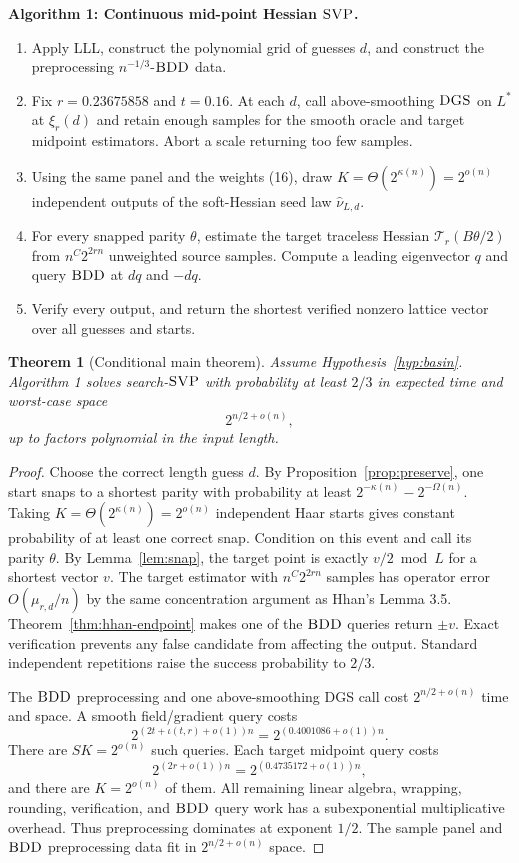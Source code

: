 \documentclass[10pt]{article}
\newtheorem{theorem}{Theorem}[section]
\theoremstyle{definition}
\newcommand{\SVP}{\textnormal{\textsc{SVP}}}
\newcommand{\BDD}{\textnormal{\textsc{BDD}}}
\newcommand{\DGS}{\textnormal{\textsc{DGS}}}
\newcommand{\what}{\widehat}
\newcommand{\cT}{\mathcal{T}}
\begin{document}
\medskip
\noindent\textbf{Algorithm 1: Continuous mid-point Hessian $\SVP$.}
\begin{enumerate}[leftmargin=2.2em,label=\arabic*.]
\item Apply LLL, construct the polynomial grid of guesses $d$, and construct
the preprocessing $n^{-1/3}$-$\BDD$ data.
\item Fix $r=0.23675858$ and $t=0.16$.  At each $d$, call above-smoothing
$\DGS$ on $L^*$ at $\xi_r(d)$ and retain enough samples for the smooth oracle
and target midpoint estimators.  Abort a scale returning too few samples.
\item Using the same panel and the weights (16), draw
$K=\Theta(2^{\kappa(n)})=2^{o(n)}$ independent outputs of the soft-Hessian
seed law $\what\nu_{L,d}$.
\item For every snapped parity $\theta$, estimate the target traceless
Hessian $\cT_r(B\theta/2)$ from $n^{C}2^{2rn}$ unweighted source samples.
Compute a leading eigenvector $q$ and query $\BDD$ at $dq$ and $-dq$.
\item Verify every output, and return the shortest verified nonzero lattice
vector over all guesses and starts.
\end{enumerate}

\begin{theorem}[Conditional main theorem]                          \label{thm:main}
Assume Hypothesis~\ref{hyp:basin}.  Algorithm 1 solves search-$\SVP$ with
probability at least $2/3$ in expected time and worst-case space
\[
 2^{n/2+o(n)},
\]
up to factors polynomial in the input length.
\end{theorem}

\begin{proof}
Choose the correct length guess $d$.  By
Proposition~\ref{prop:preserve}, one start snaps to a shortest parity with
probability at least $2^{-\kappa(n)}-2^{-\Omega(n)}$.  Taking
$K=\Theta(2^{\kappa(n)})=2^{o(n)}$ independent Haar starts gives constant
probability of at least one correct snap.  Condition on this event and call
its parity $\theta$.  By
Lemma~\ref{lem:snap}, the target point is exactly $v/2\bmod L$ for a shortest
vector $v$.  The target estimator with $n^C2^{2rn}$ samples has operator
error $O(\mu_{r,d}/n)$ by the same concentration argument as Hhan's Lemma
3.5.  Theorem~\ref{thm:hhan-endpoint} makes one of the $\BDD$ queries return
$\pm v$.  Exact verification prevents any false candidate from affecting
the output.  Standard independent repetitions raise the success probability
to $2/3$.

The $\BDD$ preprocessing and one above-smoothing DGS call cost
$2^{n/2+o(n)}$ time and space.  A smooth field/gradient query costs
\[
 2^{(2t+\iota(t,r)+o(1))n}=2^{(0.4001086+o(1))n}.
\]
There are $S K=2^{o(n)}$ such queries.  Each target midpoint query costs
\[
 2^{(2r+o(1))n}=2^{(0.4735172+o(1))n},
\]
and there are $K=2^{o(n)}$ of them.  All remaining linear algebra, wrapping,
rounding, verification, and $\BDD$ query work has a subexponential
multiplicative overhead.  Thus preprocessing dominates at exponent $1/2$.
The sample panel and $\BDD$ preprocessing data fit in
$2^{n/2+o(n)}$ space.
\end{proof}
\end{document}
